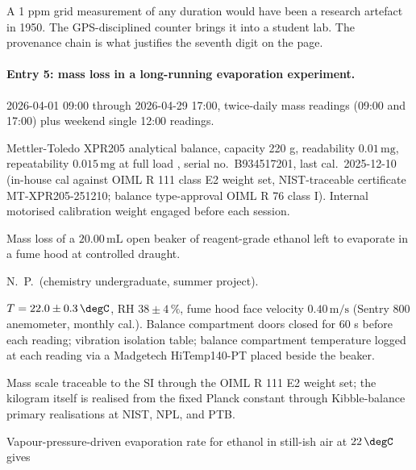 A 1 ppm grid measurement of any duration would have been a research
artefact in 1950. The GPS-disciplined counter brings it into a
student lab. The provenance chain is what justifies the seventh
digit on the page.

\paragraph{Entry 5: mass loss in a long-running evaporation
experiment.}

\begin{description}[leftmargin=2em, itemsep=2pt]
  \item[Date / time.] 2026-04-01 09{:}00 through 2026-04-29 17{:}00,
    twice-daily mass readings (09{:}00 and 17{:}00) plus weekend
    single 12{:}00 readings.
  \item[Instrument.] Mettler-Toledo XPR205 analytical balance,
    capacity 220 \si{\gram}, readability
    $0.01 \,\si{\milli\gram}$, repeatability $0.015
    \,\si{\milli\gram}$ at full load
    \cite{web:ch01t3-mettler-xpr205}, serial no.\ B934517201,
    last cal.\ 2025-12-10 (in-house cal against OIML R 111 class E2
    weight set, NIST-traceable certificate MT-XPR205-251210; balance
    type-approval OIML R 76 class I). Internal motorised
    calibration weight engaged before each session.
  \item[Measurand and setup.] Mass loss of a $20.00 \,\si{\milli
    \liter}$ open beaker of reagent-grade ethanol left to evaporate
    in a fume hood at controlled draught.
  \item[Operator.] N.~P.~(chemistry undergraduate, summer project).
  \item[Conditions.] $T = 22.0 \pm 0.3 \,\degC$, RH
    $38 \pm 4 \,\si{\percent}$, fume hood face velocity
    $0.40 \,\si{\meter\per\second}$ (Sentry 800 anemometer, monthly
    cal.). Balance compartment doors closed for 60 s before each
    reading; vibration isolation table; balance compartment
    temperature logged at each reading via a Madgetech
    HiTemp140-PT placed beside the beaker.
  \item[Provenance of reference.] Mass scale traceable to the SI
    through the OIML R 111 E2 weight set; the kilogram itself is
    realised from the fixed Planck constant
    \cite{web:bipm-mise-en-pratique-kilogram-2019} through Kibble-balance
    primary realisations at NIST, NPL, and PTB.
  \item[Estimate before reading.] Vapour-pressure-driven evaporation
    rate for ethanol in still-ish air at $22 \,\degC$ gives

\end{description}
